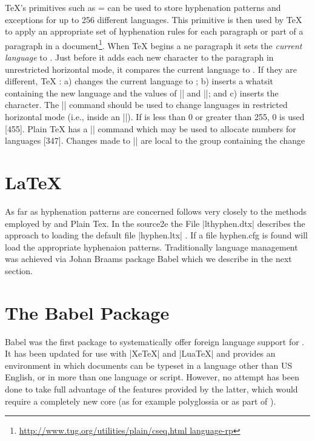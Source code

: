 TeX's primitives such as \cmd{\language}= can be used to store hyphenation patterns and exceptions for up to 256 different languages. This primitive is then used by TeX to apply an appropriate set of hyphenation rules for each paragraph or part of a paragraph in a document\footnote{\url{http://www.tug.org/utilities/plain/cseq.html language-rp}}. When TeX begins a ne paragraph it sets the \emph{current language} to \cmd{\language}. Just before it adds each new character to the paragraph in unrestricted horizontal mode, it compares the current language to \cmd{\language}. If they are different, TeX : a) changes the current language to \cmd{\language}; b) inserts a whatsit containing the new language and the values of |\lefthyphenmin| and |\righthyphenmin|; and c) inserts the character. The |\setlanguage| command should be used to change languages in restricted horizontal mode (i.e., inside an |\hbox|). If  is less than 0 or greater than 255, 0 is used [455]. Plain TeX has a |\newlanguage| command which may be used to allocate numbers for languages [347]. Changes made to |\language| are local to the group containing the change 

\section{LaTeX}

As far as hyphenation patterns are concerned \latexe follows very closely to the methods employed by \tex and Plain Tex. In the source2e the File |lthyphen.dtx| describes the approach to loading the default file |hyphen.ltx| . If a file hyphen.cfg is found \latexe will load the appropriate hyphenaion patterns. Traditionally language management was achieved via Johan 
Braams package Babel which we describe in the next section.


\section{The Babel Package} 

Babel \citet{babel} was the first package to systematically offer foreign language
support for \tex. It has been updated for use with |XeTeX| and |LuaTeX| and provides an environment
in which documents can be typeset in a language
other than US English, or in more than one language
or script. However, no attempt has been done to
take full advantage of the features provided by the
latter, which would require a completely new core
(as for example polyglossia or as part of ).

